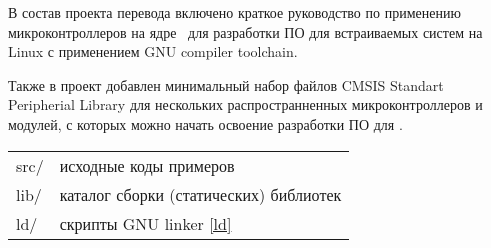 \pagebreak
{}\secdown

В состав проекта перевода включено краткое руководство по применению
микроконтроллеров на ядре \cm{}\ для разработки ПО для встраиваемых систем
на Linux с применением GNU compiler toolchain.

\bigskip\noindent
Также в проект добавлен минимальный набор файлов CMSIS Standart Peripherial
Library для нескольких распространненных микроконтроллеров и модулей, с которых
можно начать освоение разработки ПО для \cm{}.

\bigskip
\begin{tabular}{l l}
src/ & исходные коды примеров \\
lib/ & каталог сборки (статических) библиотек \\
ld/ & скрипты GNU linker \ref{ld} \\
\end{tabular}





\secup
